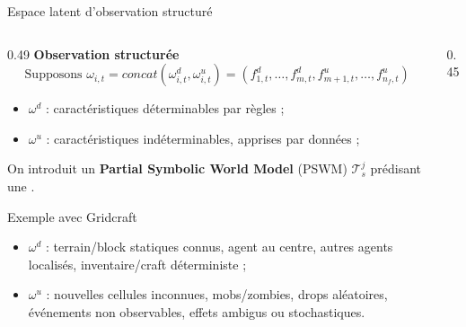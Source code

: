 \documentclass[aspectratio=169]{beamer}
\begin{document}
\begin{frame}{Espace latent d'observation structuré}
  \vspace{0.6cm}
  \scriptsize
  \begin{columns}[c,totalwidth=\textwidth]
    \begin{column}{0.49\textwidth}
      \textbf{Observation structurée}
      \vspace{-0.2cm}
      \[
        \text{Supposons }\omega_{i,t} = concat(\omega^d_{i,t}, \omega^u_{i,t}) = \left(f^d_{1,t}, \ldots, f^d_{m,t}, f^u_{m+1,t}, \ldots, f^u_{n_f,t}\right)
      \]
      \vspace{-0.6cm}
      \begin{itemize}
        \item $\omega^d$ : caractéristiques déterminables par règles ;
        \item $\omega^u$ : caractéristiques indéterminables, apprises par données ;
      \end{itemize}

      On introduit un \textbf{Partial Symbolic World Model} (PSWM) $\mathcal{T}_s^j$ prédisant une .

      \vspace{0.1cm}

      \begin{block}{\scriptsize Exemple avec Gridcraft}
        \begin{itemize}
          \item $\omega^d$ : terrain/block statiques connus, agent au centre, autres agents localisés, inventaire/craft déterministe ;
          \item $\omega^u$ : nouvelles cellules inconnues, mobs/zombies, drops aléatoires, événements non observables, effets ambigus ou stochastiques.
        \end{itemize}
      \end{block}

    \end{column}
    \begin{column}{0.45\textwidth}
      \centering
\end{column}
\end{columns}
\end{frame}
\end{document}
